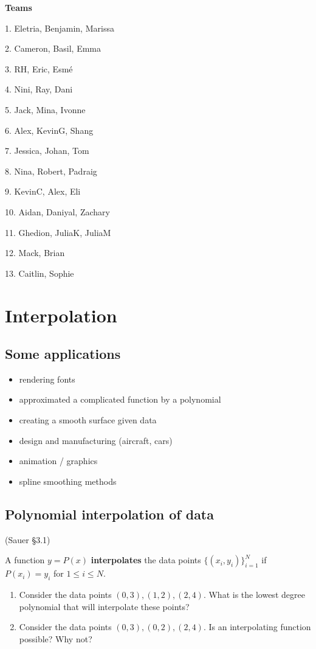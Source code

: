 \documentclass[12pt,letterpaper,noanswers]{exam}
\begin{document}
\noindent \textbf{Teams}
\begin{multicols}{3}
1. Eletria, Benjamin, Marissa

2. Cameron, Basil, Emma

3. RH, Eric, Esmé

4. Nini, Ray, Dani

5. Jack, Mina, Ivonne

6. Alex, KevinG, Shang

7. Jessica, Johan, Tom

8. Nina, Robert, Padraig

9. KevinC, Alex, Eli

10.  Aidan, Daniyal, Zachary

11. Ghedion, JuliaK, JuliaM

12. Mack, Brian

13. Caitlin, Sophie

\end{multicols}

\section*{Interpolation}
\subsection*{Some applications}
\begin{multicols}{2}
\begin{itemize}
\itemsep0pt
    \item rendering fonts
    \item approximated a complicated function by a polynomial
    \item creating a smooth surface given data
    \item design and manufacturing (aircraft, cars)
    \item animation / graphics
    \item spline smoothing methods
\end{itemize}
\end{multicols}
\subsection*{Polynomial interpolation of data}
\begin{tcolorbox}
(Sauer \S3.1)

A function $y = P(x)$ \textbf{interpolates} the data points $\{(x_i,y_i)\}_{i=1}^N$ if $P(x_i) = y_i$ for $1\leq i\leq N$.
\end{tcolorbox}
\begin{enumerate}[resume=classQ]
\item Consider the data points $(0,3), (1,2), (2,4)$.  What is the lowest degree polynomial that will interpolate these points?
\vspace{0.6in}

\item Consider the data points $(0,3), (0,2), (2,4)$.  Is an interpolating function possible?  Why not?
\vspace{0.6in}

\end{enumerate}
\end{document}
